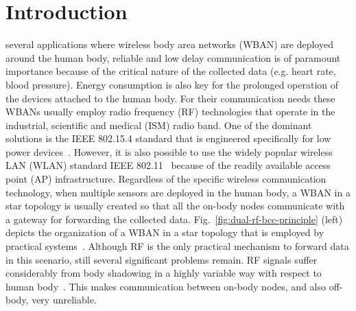 \documentclass[10pt]{IEEEtran}
\newcounter{section:outage-analysis}
\begin{document}
\section{Introduction}
 several applications where wireless body area networks (WBAN) are deployed around the human body, reliable and low delay communication is of paramount importance because of the critical nature of the collected data (e.g. heart rate, blood pressure). Energy consumption is also key for the prolonged operation of the devices attached to the human body. For their communication needs these WBANs usually employ radio frequency (RF) technologies that operate in the industrial, scientific and medical (ISM) radio band. One of the dominant solutions is the IEEE 802.15.4 standard that is engineered specifically for low power devices~\cite{IEEE-802154,survey-wban11}. However, it is also possible to use the widely popular wireless LAN (WLAN) standard IEEE 802.11~\cite{IEEE-80211,cavalcanti07} because of the readily available access point (AP) infrastructure. Regardless of the specific wireless communication technology, when multiple sensors are deployed in the human body, a WBAN in a star topology is usually created so that all the on-body nodes communicate with a gateway for forwarding the collected data. Fig.~\ref{fig:dual-rf-bcc-principle} (left) depicts the organization of a WBAN in a star topology that is employed by practical systems~\cite{survey-wban11}. Although RF is the only practical mechanism to forward data in this scenario, still several significant problems remain. RF signals suffer considerably from body shadowing in a highly variable way with respect to human body~\cite{ryckaert04,reusens07,nechayev05}. This makes communication between on-body nodes, and also off-body, very unreliable.
\end{document}
